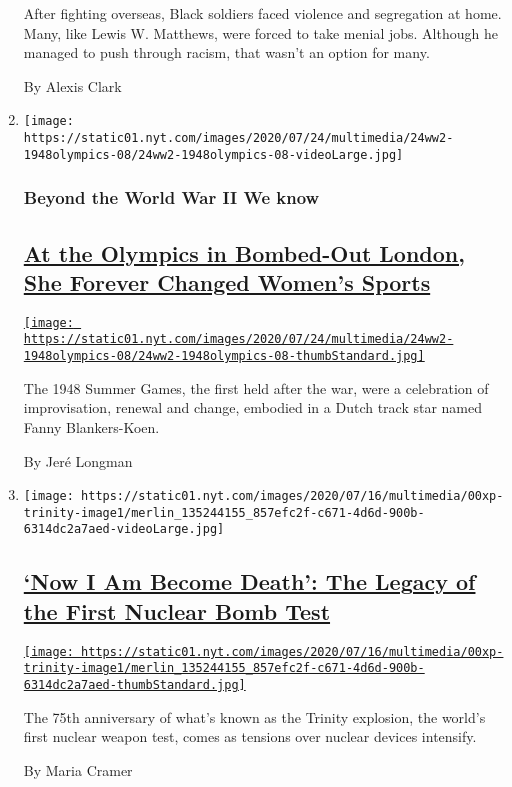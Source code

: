 \begin{enumerate}
  After fighting overseas, Black soldiers faced violence and segregation
  at home. Many, like Lewis W. Matthews, were forced to take menial
  jobs. Although he managed to push through racism, that wasn't an
  option for many.

  By Alexis Clark
\item
  \texttt{[image: https://static01.nyt.com/images/2020/07/24/multimedia/24ww2-1948olympics-08/24ww2-1948olympics-08-videoLarge.jpg]}

  \hypertarget{beyond-the-world-war-ii-we-know-2}{%
  \subsubsection{Beyond the World War II We
  know}\label{beyond-the-world-war-ii-we-know-2}}

  \hypertarget{at-the-olympics-in-bombed-out-london-she-forever-changed-womens-sports}{%
  \subsection{\texorpdfstring{\href{/2020/07/24/magazine/1948-olympics-fanny-blankers-koen.html}{At
  the Olympics in Bombed-Out London, She Forever Changed Women's
  Sports}}{At the Olympics in Bombed-Out London, She Forever Changed Women's Sports}}\label{at-the-olympics-in-bombed-out-london-she-forever-changed-womens-sports}}

  \href{/2020/07/24/magazine/1948-olympics-fanny-blankers-koen.html}{\texttt{[image: https://static01.nyt.com/images/2020/07/24/multimedia/24ww2-1948olympics-08/24ww2-1948olympics-08-thumbStandard.jpg]}}

  The 1948 Summer Games, the first held after the war, were a
  celebration of improvisation, renewal and change, embodied in a Dutch
  track star named Fanny Blankers-Koen.

  By Jeré Longman
\item
  \texttt{[image: https://static01.nyt.com/images/2020/07/16/multimedia/00xp-trinity-image1/merlin\_135244155\_857efc2f-c671-4d6d-900b-6314dc2a7aed-videoLarge.jpg]}

  \hypertarget{now-i-am-become-death-the-legacy-of-the-first-nuclear-bomb-test}{%
  \subsection{\texorpdfstring{\href{/2020/07/15/us/trinity-test-anniversary.html}{`Now
  I Am Become Death': The Legacy of the First Nuclear Bomb
  Test}}{`Now I Am Become Death': The Legacy of the First Nuclear Bomb Test}}\label{now-i-am-become-death-the-legacy-of-the-first-nuclear-bomb-test}}

  \href{/2020/07/15/us/trinity-test-anniversary.html}{\texttt{[image: https://static01.nyt.com/images/2020/07/16/multimedia/00xp-trinity-image1/merlin\_135244155\_857efc2f-c671-4d6d-900b-6314dc2a7aed-thumbStandard.jpg]}}

  The 75th anniversary of what's known as the Trinity explosion, the
  world's first nuclear weapon test, comes as tensions over nuclear
  devices intensify.

  By Maria Cramer
\end{enumerate}

